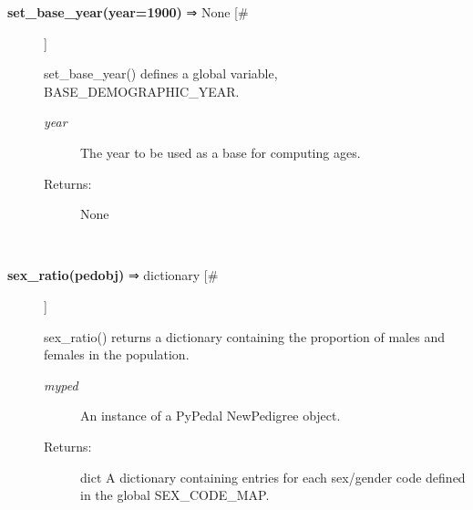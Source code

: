 \documentclass[10pt]{article}
\begin{document}
\begin{description}
\item[\textbf{set\_base\_year(year=1900)}
 ⇒ None [\#]]

 set\_base\_year() defines a global variable, BASE\_DEMOGRAPHIC\_YEAR.
\begin{description}
\item[\emph{year}
] The year to be used as a base for computing ages.
\item[Returns:] None

\end{description}
\\ 

\item[\textbf{sex\_ratio(pedobj)}
 ⇒ dictionary [\#]]

 sex\_ratio() returns a dictionary containing the proportion of males and females in the population.
\begin{description}
\item[\emph{myped}
] An instance of a PyPedal NewPedigree object.
\item[Returns:] dict A dictionary containing entries for each sex/gender code defined in the global SEX\_CODE\_MAP.

\end{description}
\\ 


\end{description}
\end{document}
